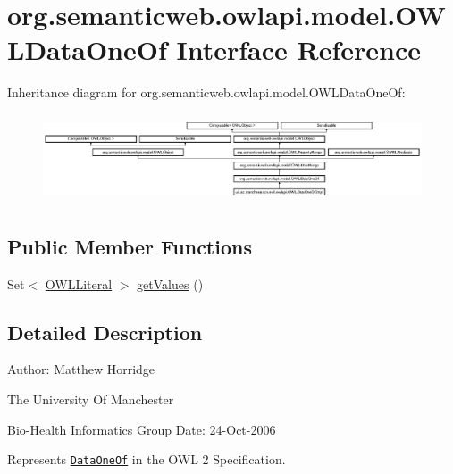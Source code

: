 \hypertarget{interfaceorg_1_1semanticweb_1_1owlapi_1_1model_1_1_o_w_l_data_one_of}{\section{org.\-semanticweb.\-owlapi.\-model.\-O\-W\-L\-Data\-One\-Of Interface Reference}
\label{interfaceorg_1_1semanticweb_1_1owlapi_1_1model_1_1_o_w_l_data_one_of}
}
Inheritance diagram for org.\-semanticweb.\-owlapi.\-model.\-O\-W\-L\-Data\-One\-Of\-:\begin{figure}[H]
\begin{center}
\leavevmode
\includegraphics[height=2.641510cm]{interfaceorg_1_1semanticweb_1_1owlapi_1_1model_1_1_o_w_l_data_one_of}
\end{center}
\end{figure}
\subsection*{Public Member Functions}
\begin{DoxyCompactItemize}
\item 
Set$<$ \hyperlink{interfaceorg_1_1semanticweb_1_1owlapi_1_1model_1_1_o_w_l_literal}{O\-W\-L\-Literal} $>$ \hyperlink{interfaceorg_1_1semanticweb_1_1owlapi_1_1model_1_1_o_w_l_data_one_of_a0301d634078c6e63d7fd88ad167e93ed}{get\-Values} ()
\end{DoxyCompactItemize}


\subsection{Detailed Description}
Author\-: Matthew Horridge\par
 The University Of Manchester\par
 Bio-\/\-Health Informatics Group Date\-: 24-\/\-Oct-\/2006 

Represents \href{http://www.w3.org/TR/2009/REC-owl2-syntax-20091027/#Enumeration_of_Literals}{\tt Data\-One\-Of} in the O\-W\-L 2 Specification. 

